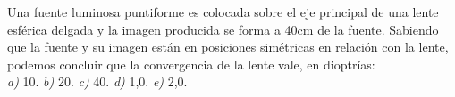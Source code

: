 
Una fuente luminosa puntiforme es colocada sobre el eje principal de una lente esférica delgada y la imagen producida se forma a 40cm de la fuente. Sabiendo que la fuente y su imagen están en posiciones simétricas en relación con la lente, podemos concluir que la convergencia de la lente vale, en dioptrías:\\
\textit{a)} 10. \textit{b)} 20. \textit{c)} 40. \textit{d)} 1,0. \textit{e)} 2,0.